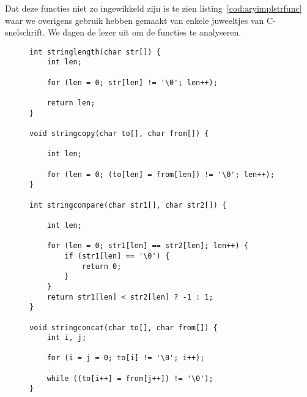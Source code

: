 Dat deze functies niet zo ingewikkeld zijn is te zien listing~\ref{cod:aryimplstrfunc} waar we overigens gebruik hebben gemaakt van enkele juweeltjes van C-snelschrift. We dagen de lezer uit om de functies te analyseren.

\begin{figure}[!ht]
\begin{lstlisting}[caption=Een implementatie van de stringfuncties.,label=cod:aryimplstrfunc]
int stringlength(char str[]) {
	int len;

	for (len = 0; str[len] != '\0'; len++);

	return len;
}

void stringcopy(char to[], char from[]) {

	int len;

	for (len = 0; (to[len] = from[len]) != '\0'; len++);
}

int stringcompare(char str1[], char str2[]) {

	int len;

	for (len = 0; str1[len] == str2[len]; len++) {
		if (str1[len] == '\0') {
			return 0;
		}
	}
	return str1[len] < str2[len] ? -1 : 1;
}

void stringconcat(char to[], char from[]) {
	int i, j;

	for (i = j = 0; to[i] != '\0'; i++);

	while ((to[i++] = from[j++]) != '\0');
}
\end{lstlisting}
\end{figure}
